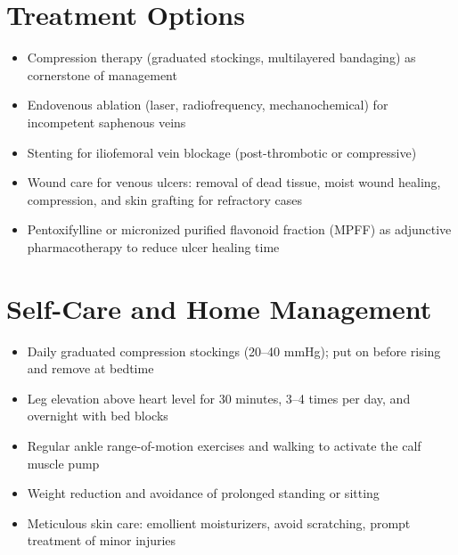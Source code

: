 \section*{Treatment Options}
\begin{itemize}
  \item Compression therapy (graduated stockings, multilayered bandaging) as cornerstone of management
  \item Endovenous ablation (laser, radiofrequency, mechanochemical) for incompetent saphenous veins
  \item Stenting for iliofemoral vein blockage (post-thrombotic or compressive)
  \item Wound care for venous ulcers: removal of dead tissue, moist wound healing, compression, and skin grafting for refractory cases
  \item Pentoxifylline or micronized purified flavonoid fraction (MPFF) as adjunctive pharmacotherapy to reduce ulcer healing time
\end{itemize}

\section*{Self-Care and Home Management}
\begin{itemize}
  \item Daily graduated compression stockings (20--40 mmHg); put on before rising and remove at bedtime
  \item Leg elevation above heart level for 30 minutes, 3--4 times per day, and overnight with bed blocks
  \item Regular ankle range-of-motion exercises and walking to activate the calf muscle pump
  \item Weight reduction and avoidance of prolonged standing or sitting
  \item Meticulous skin care: emollient moisturizers, avoid scratching, prompt treatment of minor injuries
\end{itemize}


